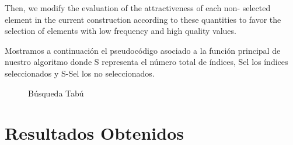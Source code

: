Then, we modify the evaluation of the attractiveness of each non-
selected element in the current construction according to these quantities to favor the selection of
elements with low frequency and high quality values.


Mostramos a continuación el pseudocódigo asociado a la función principal de nuestro algoritmo donde S representa el número total de índices, Sel los índices seleccionados y S-Sel los no seleccionados.

\begin{figure}[H]
	\centering
	\begin{minipage}{.95\linewidth}
		
		
		
		\begin{algorithm}[H] 
			
			\caption{Búsqueda Tabú}
			\SetAlgoLined
			
			
			
		\end{algorithm} 
		
	\end{minipage}
\end{figure}

\newpage











\section{Resultados Obtenidos}













